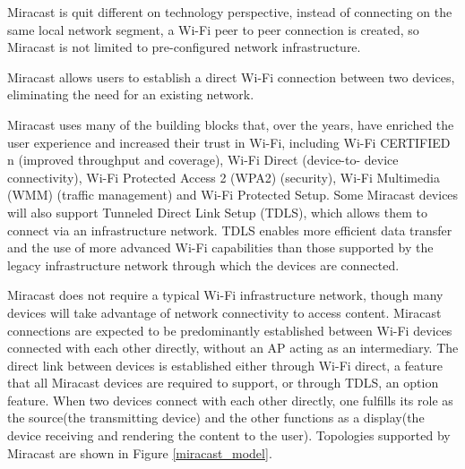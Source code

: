 Miracast \cite{miracast_industry} is quit different on technology perspective,
instead of connecting on the same local network segment, a Wi-Fi peer to peer
connection is created, so Miracast is not limited to pre-configured network infrastructure.

Miracast allows users to establish a direct Wi-Fi connection between two
devices, eliminating the need for an existing network.

Miracast uses many of the building blocks that, over the years, have enriched
the user experience and increased their trust in Wi-Fi, including Wi-Fi
CERTIFIED n (improved throughput and coverage), Wi-Fi Direct (device-to-
device connectivity), Wi-Fi Protected Access 2 (WPA2) (security), Wi-Fi
Multimedia (WMM) (traffic management) and Wi-Fi Protected Setup. Some
Miracast devices will also support Tunneled Direct Link Setup (TDLS), which
allows them to connect via an infrastructure network. TDLS enables more
efficient data transfer and the use of more advanced Wi-Fi capabilities than
those supported by the legacy infrastructure network through which the devices
are connected.

Miracast does not require a typical Wi-Fi infrastructure network, though many
devices will take advantage of network connectivity to access content. Miracast
connections are expected to be predominantly established between Wi-Fi devices
connected with each other directly, without an AP acting as an intermediary.
The direct link between devices is established either through Wi-Fi direct, a
feature that all Miracast devices are required to support, or through TDLS, an
option feature. When two devices connect with each other directly, one fulfills
its role as the source(the transmitting device) and the other functions as a
display(the device receiving and rendering the content to the user). Topologies
supported by Miracast are shown in Figure \ref{miracast_model}. 


